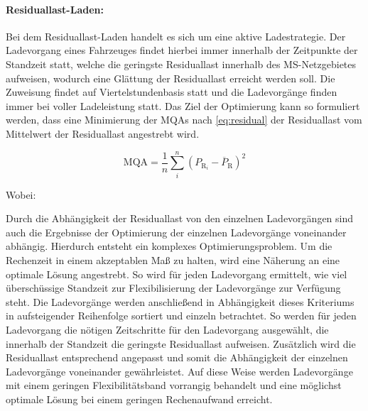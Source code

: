 \paragraph{Residuallast-Laden:}

Bei dem Residuallast-Laden handelt es sich um eine aktive Ladestrategie.
Der Ladevorgang eines Fahrzeuges findet hierbei immer innerhalb der Zeitpunkte der Standzeit statt, welche die geringste Residuallast innerhalb des \gls{MS}-Netzgebietes aufweisen, wodurch eine Glättung der Residuallast erreicht werden soll.
Die Zuweisung findet auf Viertelstundenbasis statt und die Ladevorgänge finden immer bei voller Ladeleistung statt.
Das Ziel der Optimierung kann so formuliert werden, dass eine Minimierung der \glspl{MQA} nach \autoref{eq:residual} der Residuallast vom Mittelwert der Residuallast angestrebt wird.

\begin{equation}
	\text{MQA} = \frac{1}{n} \sum_i^n \left( P_{\text{R}_i} - \overline{P}_{\text{R}} \right)^2
	\label{eq:residual}
\end{equation}

\noindent Wobei:


Durch die Abhängigkeit der Residuallast von den einzelnen Ladevorgängen sind auch die Ergebnisse der Optimierung der einzelnen Ladevorgänge voneinander abhängig.
Hierdurch entsteht ein komplexes Optimierungsproblem.
Um die Rechenzeit in einem akzeptablen Maß zu halten, wird eine Näherung an eine optimale Lösung angestrebt.
So wird für jeden Ladevorgang ermittelt, wie viel überschüssige Standzeit zur Flexibilisierung der Ladevorgänge zur Verfügung steht.
Die Ladevorgänge werden anschließend in Abhängigkeit dieses Kriteriums in aufsteigender Reihenfolge sortiert und einzeln betrachtet.
So werden für jeden Ladevorgang die nötigen Zeitschritte für den Ladevorgang ausgewählt, die innerhalb der Standzeit die geringste Residuallast aufweisen.
Zusätzlich wird die Residuallast entsprechend angepasst und somit die Abhängigkeit der einzelnen Ladevorgänge voneinander gewährleistet.
Auf diese Weise werden Ladevorgänge mit einem geringen Flexibilitätsband vorrangig behandelt und eine möglichst optimale Lösung bei einem geringen Rechenaufwand erreicht.


